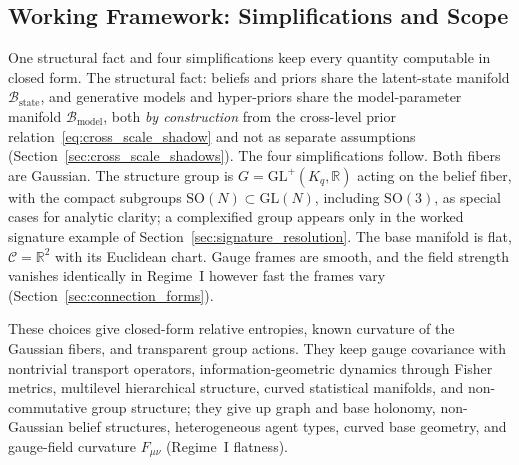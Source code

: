 \documentclass[11pt]{article}
\begin{document}
\subsection{Working Framework: Simplifications and Scope}
\label{sec:working_framework}

One structural fact and four simplifications keep every quantity computable in closed form. The structural fact: beliefs and priors share the latent-state manifold $\mathcal{B}_{\mathrm{state}}$, and generative models and hyper-priors share the model-parameter manifold $\mathcal{B}_{\mathrm{model}}$, both \emph{by construction} from the cross-level prior relation~\eqref{eq:cross_scale_shadow} and not as separate assumptions (Section~\ref{sec:cross_scale_shadows}). The four simplifications follow. Both fibers are Gaussian. The structure group is $G = \mathrm{GL}^+(K_q, \mathbb{R})$ acting on the belief fiber, with the compact subgroups $\mathrm{SO}(N) \subset \mathrm{GL}(N)$, including $\mathrm{SO}(3)$, as special cases for analytic clarity; a complexified group appears only in the worked signature example of Section~\ref{sec:signature_resolution}. The base manifold is flat, $\mathcal{C} = \mathbb{R}^2$ with its Euclidean chart. Gauge frames are smooth, and the field strength vanishes identically in Regime~I however fast the frames vary (Section~\ref{sec:connection_forms}).

These choices give closed-form relative entropies, known curvature of the Gaussian fibers, and transparent group actions. They keep gauge covariance with nontrivial transport operators, information-geometric dynamics through Fisher metrics, multilevel hierarchical structure, curved statistical manifolds, and non-commutative group structure; they give up graph and base holonomy, non-Gaussian belief structures, heterogeneous agent types, curved base geometry, and gauge-field curvature $F_{\mu\nu}$ (Regime~I flatness).
\end{document}
